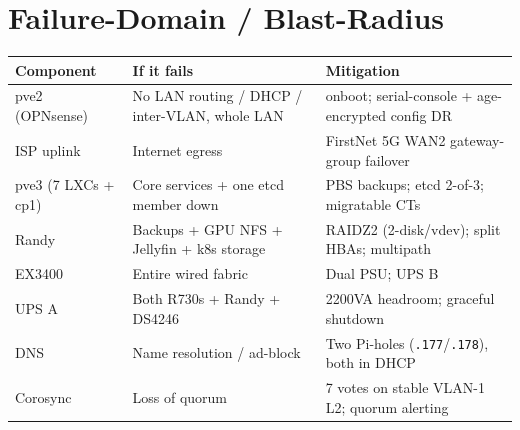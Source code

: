 \documentclass[11pt,letterpaper]{article}
\newcommand{\ip}[1]{\texttt{#1}}
\begin{document}
\section{Failure-Domain / Blast-Radius}
\begin{center}\footnotesize
\begin{tabularx}{\textwidth}{@{}l X l@{}}
\toprule Component & If it fails & Mitigation \\ \midrule
pve2 (OPNsense) & No LAN routing / DHCP / inter-VLAN, whole LAN & onboot; serial-console + age-encrypted config DR \\
ISP uplink & Internet egress & FirstNet 5G WAN2 gateway-group failover \\
pve3 (7 LXCs + cp1) & Core services + one etcd member down & PBS backups; etcd 2-of-3; migratable CTs \\
Randy & Backups + GPU NFS + Jellyfin + k8s storage & RAIDZ2 (2-disk/vdev); split HBAs; multipath \\
EX3400 & Entire wired fabric & Dual PSU; UPS B \\
UPS A & Both R730s + Randy + DS4246 & 2200VA headroom; graceful shutdown \\
DNS & Name resolution / ad-block & Two Pi-holes (\ip{.177}/\ip{.178}), both in DHCP \\
Corosync & Loss of quorum & 7 votes on stable VLAN-1 L2; quorum alerting \\
\bottomrule
\end{tabularx}
\end{center}
\end{document}
